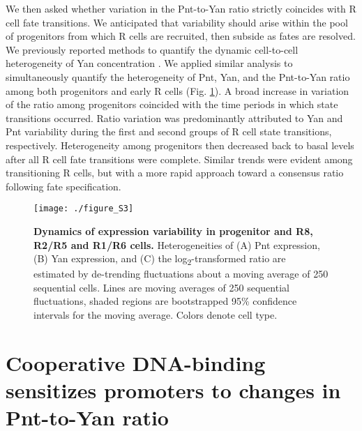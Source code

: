 We then asked whether variation in the Pnt-to-Yan ratio strictly coincides with R cell fate transitions. We anticipated that variability should arise within the pool of progenitors from which R cells are recruited, then subside as fates are resolved. We previously reported methods to quantify the dynamic cell-to-cell heterogeneity of Yan concentration \cite{Pelaez2015a}. We applied similar analysis to simultaneously quantify the heterogeneity of Pnt, Yan, and the Pnt-to-Yan ratio among both progenitors and early R cells (Fig. \ref{fig:ratio:figS3}). A broad increase in variation of the ratio among progenitors coincided with the time periods in which state transitions occurred. Ratio variation was predominantly attributed to Yan and Pnt variability during the first and second groups of R cell state transitions, respectively. Heterogeneity among progenitors then decreased back to basal levels after all R cell fate transitions were complete. Similar trends were evident among transitioning R cells, but with a more rapid approach toward a consensus ratio following fate specification.

\begin{figure}[h]
\centering
\texttt{[image: ./figure\_S3]}
\caption[Dynamics of expression variability in progenitors and R cells.]{\textbf{Dynamics of expression variability in progenitor and R8, R2/R5 and R1/R6 cells.} Heterogeneities of (A) Pnt expression, (B) Yan expression, and (C) the log\textsubscript{2}-transformed ratio are estimated by de-trending fluctuations about a moving average of 250 sequential cells. Lines are moving averages of 250 sequential fluctuations, shaded regions are bootstrapped 95\% confidence intervals for the moving average. Colors denote cell type.}
\label{fig:ratio:figS3}
\end{figure}

\section{Cooperative DNA-binding sensitizes promoters to changes in Pnt-to-Yan ratio}

